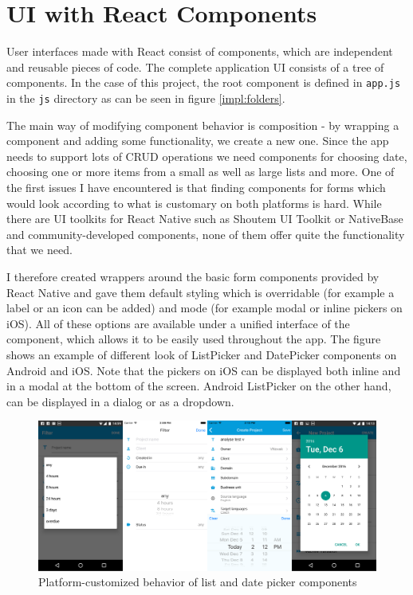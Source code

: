 \section{UI with React Components}

User interfaces made with React consist of components, which are independent and reusable pieces of code. The complete application UI consists of a tree of components. In the case of this project, the root component is defined in \texttt{app.js} in the \texttt{js} directory as can be seen in figure \ref{impl:folders}.

The main way of modifying component behavior is composition - by wrapping a component and adding some functionality, we create a new one. Since the app needs to support lots of CRUD operations we need components for choosing date, choosing one or more items from a small as well as large lists and more. One of the first issues I have encountered is that finding components for forms which would look according to what is customary on both platforms is hard. While there are UI toolkits for React Native such as Shoutem UI Toolkit or NativeBase and community-developed components, none of them offer quite the functionality that we need.

I therefore created wrappers around the basic form components provided by React Native and gave them default styling which is overridable (for example a label or an icon can be added) and mode (for example modal or inline pickers on iOS). All of these options are available under a unified interface of the component, which allows it to be easily used throughout the app. The figure shows an example of different look of ListPicker and DatePicker components on Android and iOS. Note that the pickers on iOS can be displayed both inline and in a modal at the bottom of the screen. Android ListPicker on the other hand, can be displayed in a dialog or as a dropdown.

\begin{figure}[H]
	\includegraphics[width=1\textwidth]{pics/components}
	\caption{Platform-customized behavior of list and date picker components}
	\label{components}
\end{figure}


